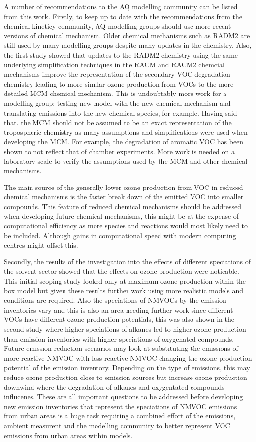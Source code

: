 A number of recommendations to the AQ modelling community can be listed from this work.
Firstly, to keep up to date with the recommendations from the chemical kineticy community, AQ modelling groups should use more recent versions of chemical mechanism.
Older chemical mechanisms such as RADM2 are still used by many modelling groups despite many updates in the chemistry. 
Also, the first study showed that updates to the RADM2 chemistry using the same underlying simplification techniques in the RACM and RACM2 chemcial mechanisms improve the representation of the secondary VOC degradation chemistry leading to more similar ozone production from VOCs to the more detailed MCM chemical mechanism.
This is undoubtably more work for a modelling group: testing new model with the new chemical mechanism and translating emissions into the new chemical species, for example.
Having said that, the MCM should not be assumed to be an exact representation of the tropospheric chemistry as many assumptions and simplifications were used when developing the MCM.
For example, the degradation of aromatic VOC has been shown to not reflect that of chamber experiments.
More work is needed on a laboratory scale to verify the assumptions used by the MCM and other chemical mechanisms.

The main source of the generally lower ozone production from VOC in reduced chemical mechanisms is the faster break down of the emitted VOC into smaller compounds.
This feature of reduced chemical mechanisms should be addressed when developing future chemical mechanisms, this might be at the expense of computational efficiency as more species and reactions would most likely need to be included.
Although gains in computational speed with modern computing centres might offset this.

Secondly, the results of the investigation into the effects of different speciations of the solvent sector showed that the effects on ozone production were noticable.
This initial scoping study looked only at maximum ozone production within the box model but given these results further work using more realistic models and conditions are required.
Also the speciations of NMVOCs by the emission inventories vary and this is also an area needing further work since different VOCs have different ozone production potentials, this was also shown in the second study where higher speciations of alkanes led to higher ozone production than emission inventories with higher speciations of oxygenated compounds.
Future emission reduction scenarios may look at substituting the emissions of more reactive NMVOC with less reactive NMVOC changing the ozone production potential of the emission inventory.
Depending on the type of emissions, this may reduce ozone production close to emission sources but increase ozone production downwind where the degradation of alkanes and oxygentated compounds influcenes.
These are all important questions to be addressed before developing new emission inventories that represent the speciations of NMVOC emissions from urban areas is a huge task requiring a combined effort of the emissions, ambient measurent and the modelling community to better represent VOC emissions from urban areas within models.

